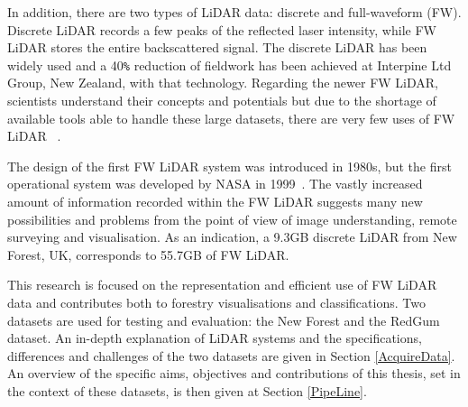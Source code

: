 \documentclass{subfiles}
\begin{document}
	\par In addition, there are two types of LiDAR data: discrete and full-waveform (FW). {\color{blue} Discrete LiDAR records a few peaks of the reflected laser intensity, while FW LiDAR stores the entire backscattered signal}. The discrete LiDAR has been widely used and a 40\verb|%| reduction of fieldwork has been achieved at Interpine Ltd Group, New Zealand, with that technology. Regarding the newer FW LiDAR, scientists understand their concepts and potentials but due to the shortage of available tools able to handle these large datasets, there are very few uses of FW LiDAR ~\cite{Anderson2015}. 
	
	\par  The design of the first FW LiDAR system was introduced in 1980s, but the first operational system was developed by NASA in 1999~\cite{Chauve2007}. The vastly increased amount of information recorded within the FW LiDAR suggests many new possibilities and problems from the point of view of image understanding, remote surveying and visualisation. As an indication, a 9.3GB discrete LiDAR from New Forest, UK, corresponds to 55.7GB of FW LiDAR. 
	
	{\color{blue} This research is focused on the representation and efficient use of FW LiDAR data and contributes both to forestry visualisations and classifications. Two datasets are used for testing and evaluation: the New Forest and the RedGum dataset. An in-depth explanation of LiDAR systems and the specifications, differences and challenges of the two datasets are given in Section \ref{AcquireData}. An overview of the specific aims, objectives and contributions of this thesis, set in the context of these datasets, is then given at Section \ref{PipeLine}. }
	    
\end{document}
